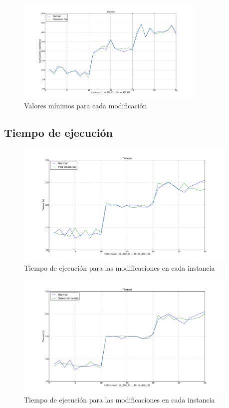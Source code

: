 \begin{figure}[h!]
\begin{center}
\includegraphics[width=0.8\textwidth]{img/min-4.pdf}
\end{center}
\caption{Valores mínimos para cada modificación}
\label{fig:min-4}
\end{figure}


\newpage
\subsection{Tiempo de ejecución}

\begin{figure}[h!]
\begin{center}
\includegraphics[width=0.95\textwidth]{img/t-1.pdf}
\end{center}
\caption{Tiempo de ejecución para las modificaciones en cada instancia}
\label{fig:t-1}
\end{figure}

\begin{figure}[h!]
\begin{center}
\includegraphics[width=0.95\textwidth]{img/t-2.pdf}
\end{center}
\caption{Tiempo de ejecución para las modificaciones en cada instancia}
\label{fig:t-2}
\end{figure}

